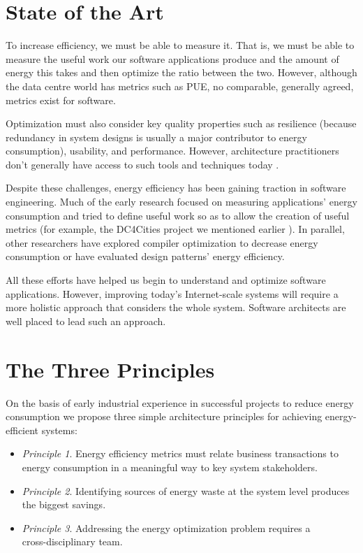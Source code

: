 \section{State of the Art}

To increase efficiency, we must be able to measure it. That is, we must be able to measure the useful work our software applications produce and the amount of energy this takes and then optimize the ratio between the two. However, although the data centre world has metrics such as PUE, no comparable, generally agreed, metrics exist for software.

Optimization must also consider key quality properties such as resilience (because redundancy in system designs is usually a major contributor to energy consumption), usability, and performance. However, architecture practitioners don't generally have access to such tools and techniques today \cite{bashroush2016-datacentreenergy}.

Despite these challenges, energy efficiency has been gaining traction in software engineering. Much of the early research focused on measuring applications' energy consumption \cite{islam2016-energysoftwarefeatures} and tried to define useful work so as to allow the creation of useful metrics (for example, the DC4Cities project we mentioned earlier \cite{dc4cities2014_dcmetrics}). In parallel, other researchers have explored compiler optimization to decrease energy consumption or have evaluated design patterns' energy efficiency.

All these efforts have helped us begin to understand and optimize software applications. However, improving today's Internet-scale systems will require a more holistic approach that considers the whole system. Software architects are well placed to lead such an approach.

\section{The Three Principles}

On the basis of early industrial experience in successful projects to reduce energy consumption we propose three simple architecture principles for achieving energy-efficient systems:

\begin{itemize}
\item \emph{Principle 1}. Energy efficiency metrics must relate business transactions to energy consumption in a meaningful way to key system stakeholders.
\item \emph{Principle 2}. Identifying sources of energy waste at the system level produces the biggest savings.
\item \emph{Principle 3}. Addressing the energy optimization problem requires a \\ cross-disciplinary team.
\end{itemize}

